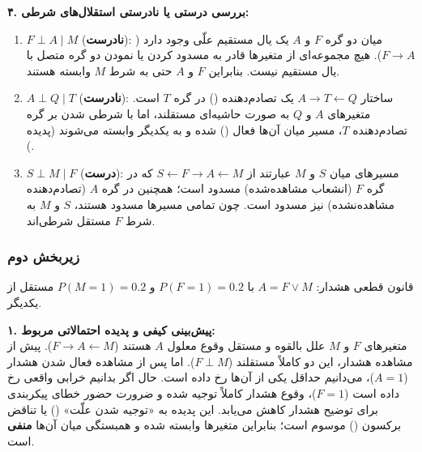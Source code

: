 \textbf{۴. بررسی درستی یا نادرستی استقلال‌های شرطی:}
\begin{enumerate}
  \item $F \perp A \mid M$ (\textbf{نادرست}): میان دو گره $F$ و $A$ یک یال مستقیم علّی وجود دارد ($F \to A$). هیچ مجموعه‌ای از متغیرها قادر به مسدود کردن یا  نمودن دو گره متصل با یال مستقیم نیست. بنابراین $F$ و $A$ حتی به شرط $M$ وابسته هستند.
  \item $A \perp Q \mid T$ (\textbf{نادرست}): ساختار $A \to T \leftarrow Q$ یک تصادم‌دهنده () در گره $T$ است. متغیرهای $A$ و $Q$ به صورت حاشیه‌ای مستقلند، اما با شرطی شدن بر گره تصادم‌دهنده $T$، مسیر میان آن‌ها فعال () شده و به یکدیگر وابسته می‌شوند (پدیده ).
  \item $S \perp M \mid F$ (\textbf{درست}): مسیرهای میان $S$ و $M$ عبارتند از $S \leftarrow F \to A \leftarrow M$ که در گره $F$ (انشعاب مشاهده‌شده) مسدود است؛ همچنین در گره $A$ (تصادم‌دهنده مشاهده‌نشده) نیز مسدود است. چون تمامی مسیرها مسدود هستند، $S$ و $M$ به شرط $F$ مستقل شرطی‌اند.
\end{enumerate}

\subsubsection{زیربخش دوم}

قانون قطعی هشدار: $A = F \lor M$ با $P(F=1) = 0.2$ و $P(M=1) = 0.2$ مستقل از یکدیگر.

\textbf{۱. پیش‌بینی کیفی و پدیده احتمالاتی مربوط:} \\
متغیرهای $F$ و $M$ علل بالقوه و مستقل وقوع معلول $A$ هستند ($F \to A \leftarrow M$). پیش از مشاهده هشدار، این دو کاملاً مستقلند ($F \perp M$). اما پس از مشاهده فعال شدن هشدار ($A=1$)، می‌دانیم حداقل یکی از آن‌ها رخ داده است. حال اگر بدانیم خرابی واقعی رخ داده است ($F=1$)، وقوع هشدار کاملاً توجیه شده و ضرورت حضور خطای پیکربندی برای توضیح هشدار کاهش می‌یابد. این پدیده به «توجیه شدن علّت» () یا تناقض برکسون () موسوم است؛ بنابراین متغیرها وابسته شده و همبستگی میان آن‌ها \textbf{منفی} است.

